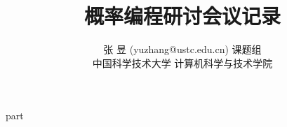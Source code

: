 \documentclass[a4paper,11pt,titlepage]{article}
\begin{document}
\title{概率编程研讨会议记录}

\author{
\rm 张 昱 (yuzhang@ustc.edu.cn) 课题组\\
中国科学技术大学 计算机科学与技术学院
}

\maketitle
\tableofcontents
\setcounter{tocdepth}{3}
\newpage
{}

{part}
\newpage
\begin{footnotesize}
%
\end{footnotesize}
\end{document}
